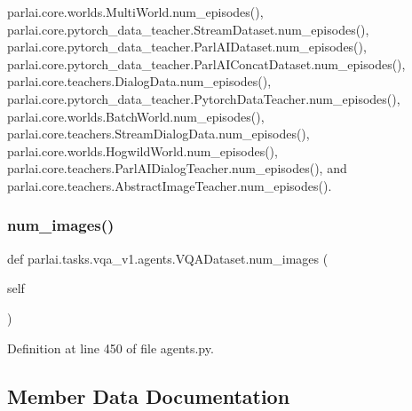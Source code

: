 parlai.\+core.\+worlds.\+Multi\+World.\+num\+\_\+episodes(), parlai.\+core.\+pytorch\+\_\+data\+\_\+teacher.\+Stream\+Dataset.\+num\+\_\+episodes(), parlai.\+core.\+pytorch\+\_\+data\+\_\+teacher.\+Parl\+A\+I\+Dataset.\+num\+\_\+episodes(), parlai.\+core.\+pytorch\+\_\+data\+\_\+teacher.\+Parl\+A\+I\+Concat\+Dataset.\+num\+\_\+episodes(), parlai.\+core.\+teachers.\+Dialog\+Data.\+num\+\_\+episodes(), parlai.\+core.\+pytorch\+\_\+data\+\_\+teacher.\+Pytorch\+Data\+Teacher.\+num\+\_\+episodes(), parlai.\+core.\+worlds.\+Batch\+World.\+num\+\_\+episodes(), parlai.\+core.\+teachers.\+Stream\+Dialog\+Data.\+num\+\_\+episodes(), parlai.\+core.\+worlds.\+Hogwild\+World.\+num\+\_\+episodes(), parlai.\+core.\+teachers.\+Parl\+A\+I\+Dialog\+Teacher.\+num\+\_\+episodes(), and parlai.\+core.\+teachers.\+Abstract\+Image\+Teacher.\+num\+\_\+episodes().

\mbox{\label{classparlai_1_1tasks_1_1vqa__v1_1_1agents_1_1VQADataset_a35425d8a31193d50ad5b1c558322ea93}} 
\subsubsection{\texorpdfstring{num\+\_\+images()}{num\_images()}}
{\footnotesize\ttfamily def parlai.\+tasks.\+vqa\+\_\+v1.\+agents.\+V\+Q\+A\+Dataset.\+num\+\_\+images (\begin{DoxyParamCaption}\item[{}]{self }\end{DoxyParamCaption})}



Definition at line 450 of file agents.\+py.



\subsection{Member Data Documentation}
\mbox{\label{classparlai_1_1tasks_1_1vqa__v1_1_1agents_1_1VQADataset_aa326215f8c63be2e137cad09cafd7c3d}} 
